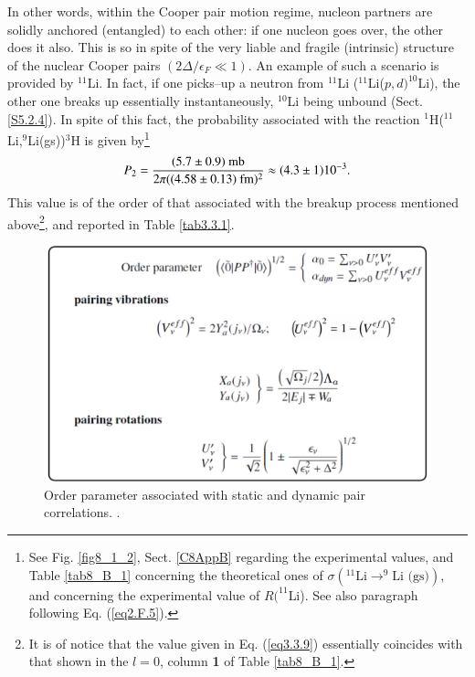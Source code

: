 In other words, within the Cooper pair motion regime, nucleon partners are solidly anchored (entangled) to each other: if one nucleon goes over, the other does it also. This is so in spite of the very liable and fragile (intrinsic) structure of the nuclear Cooper pairs $(2\Delta/\epsilon_F\ll1)$. An example of such a  scenario is  provided by $^{11}$Li. In fact, if one picks--up a neutron from $^{11}$Li ($^{11}$Li($p,d)^{10}$Li), the other one breaks up essentially instantaneously, $^{10}$Li being unbound (Sect. \ref{S5.2.4}). In spite of this fact, the probability associated with the reaction $^1$H($^{11}$Li,$^9$Li(gs))$^{3}$H is given by\footnote{See  Fig. \ref{fig8_1_2}, Sect. \ref{C8AppB} regarding the experimental values, and Table \ref{tab8_B_1} concerning the theoretical ones of \mbox{$\sigma(^{11}\text{Li}\to ^{9}\text{Li (gs)})$}, and \cite{Kobayashi:89} concerning the experimental value of $R(^{11}$Li). See also paragraph following Eq. (\ref{eq2.F.5}).}
\begin{align}\label{eq3.3.9}
P_2=\frac{(5.7\pm0.9)\text{ mb}}{2\pi((4.58\pm0.13)\text{ fm})^2}\approx(4.3\pm1)10^{-3}. \idx{Two-nucleon transfer!one- and two-particle transfer probabilities}
\end{align}
This value is of the order of that associated with the breakup process mentioned above\footnote{It is of notice that the value given in Eq. (\ref{eq3.3.9}) essentially coincides with that shown in the $l=0$, column \textbf{1} of  Table \ref{tab8_B_1}.}, and reported in  Table \ref{tab3.3.1}.
\begin{figure}
\centerline{\includegraphics*[width=15cm,angle=0]{nutshell/figs/fig3_3_2.pdf}}
\caption{Order parameter associated with static and dynamic pair correlations. .}\label{fig3.3.2}
\end{figure}
